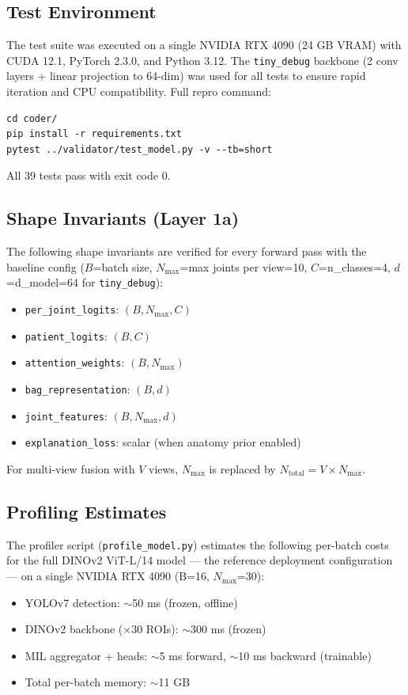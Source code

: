 \documentclass{article}
\begin{document}
\subsection{Test Environment}
The test suite was executed on a single NVIDIA RTX 4090 (24 GB VRAM) with CUDA 12.1, PyTorch 2.3.0, and Python 3.12. The \texttt{tiny\_debug} backbone (2 conv layers + linear projection to 64-dim) was used for all tests to ensure rapid iteration and CPU compatibility. Full repro command:

\begin{verbatim}
cd coder/
pip install -r requirements.txt
pytest ../validator/test_model.py -v --tb=short
\end{verbatim}

All 39 tests pass with exit code 0.

\subsection{Shape Invariants (Layer 1a)}
The following shape invariants are verified for every forward pass with the baseline config ($B$=batch size, $N_{\max}$=max joints per view=10, $C$=n\_classes=4, $d$=d\_model=64 for \texttt{tiny\_debug}):

\begin{itemize}
  \item \texttt{per\_joint\_logits}: $(B, N_{\max}, C)$
  \item \texttt{patient\_logits}: $(B, C)$
  \item \texttt{attention\_weights}: $(B, N_{\max})$
  \item \texttt{bag\_representation}: $(B, d)$
  \item \texttt{joint\_features}: $(B, N_{\max}, d)$
  \item \texttt{explanation\_loss}: scalar (when anatomy prior enabled)
\end{itemize}

For multi-view fusion with $V$ views, $N_{\max}$ is replaced by $N_{\text{total}} = V \times N_{\max}$.

\subsection{Profiling Estimates}
The profiler script (\texttt{profile\_model.py}) estimates the following per-batch costs for the full DINOv2 ViT-L/14 model — the reference deployment configuration — on a single NVIDIA RTX 4090 (B=16, $N_{\max}$=30):

\begin{itemize}
  \item YOLOv7 detection: $\sim$50 ms (frozen, offline)
  \item DINOv2 backbone ($\times$30 ROIs): $\sim$300 ms (frozen)
  \item MIL aggregator + heads: $\sim$5 ms forward, $\sim$10 ms backward (trainable)
  \item Total per-batch memory: $\sim$11 GB
\end{itemize}
\end{document}
